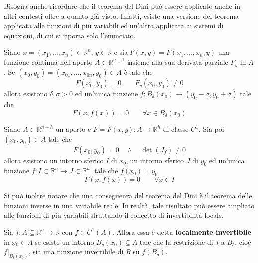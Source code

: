 Bisogna anche ricordare che il teorema del Dini può essere applicato anche in altri contesti oltre a quanto già visto. Infatti, esiste una versione del teorema applicata alle funzioni di più variabili ed un'altra applicata ai sistemi di equazioni, di cui si riporta solo l'enunciato.
\begin{theorem}
Siano $x=(x_1, \dots, x_n) \in \mathbb{R}^n$, $y \in \mathbb{R}$ e sia $F(x, y)=F(x_1, \dots, x_n, y)$ una funzione continua nell'aperto $A \in \mathbb{R}^{n+1}$ insieme alla sua derivata parziale $F_y$ in $A$. Se $(x_0, y_0)=(x_{01}, \dots, x_{0n}, y_0)\in A$ è tale che
\begin{equation}
    F(x_0, y_0)=0 \qquad F_y(x_0, y_0) \neq 0
\end{equation}
allora esistono $\delta, \sigma>0$ ed un'unica funzione $f: B_\delta(x_0) \to (y_0-\sigma, y_0+ \sigma)$ tale che 
\begin{equation}
    F(x, f(x))=0 \qquad \forall x \in B_\delta(x_0)
\end{equation}
\end{theorem}
\begin{theorem}
    Siano $A \in \mathbb{R}^{n+h}$ un aperto e $F=F(x,y): A \to \mathbb{R}^h$ di classe $C^1$. Sia poi $(x_0, y_0) \in A$ tale che
    \begin{equation}
        F(x_0, y_0)=0\quad \land \quad \det(J_f) \neq 0
    \end{equation}
    allora esistono un intorno sferico $I$ di $x_0$, un intorno sferico $J$ di $y_0$ ed un'unica funzione $f: I \subset \mathbb{R}^n \to J \subset\mathbb{R}^h$. tale che $f(x_0)=y_0$
    \begin{equation}
        F(x, f(x))=0 \qquad \forall x \in I
    \end{equation}
\end{theorem}
Si può inoltre notare che una conseguenza del teorema del Dini è il teorema delle funzioni inverse in una variabile reale. In realtà, tale risultato può essere ampliato alle funzioni di più variabili sfruttando il concetto di invertibilità locale.
\begin{definition} \label{Def: Invertibilità locale}
    Sia $f: A \subseteq \mathbb{R}^n \to \mathbb{R}$ con $f \in C^1(A)$. Allora essa è detta \textbf{localmente invertibile} in $x_0 \in A$ se esiste un intorno $B_\delta(x_0) \subseteq A$ tale che la restrizione di $f$ a $B_\delta$, cioè $f\big|_{B_\delta(x_0)}$, sia una funzione invertibile di $B$ su $f(B_\delta)$.
\end{definition}
